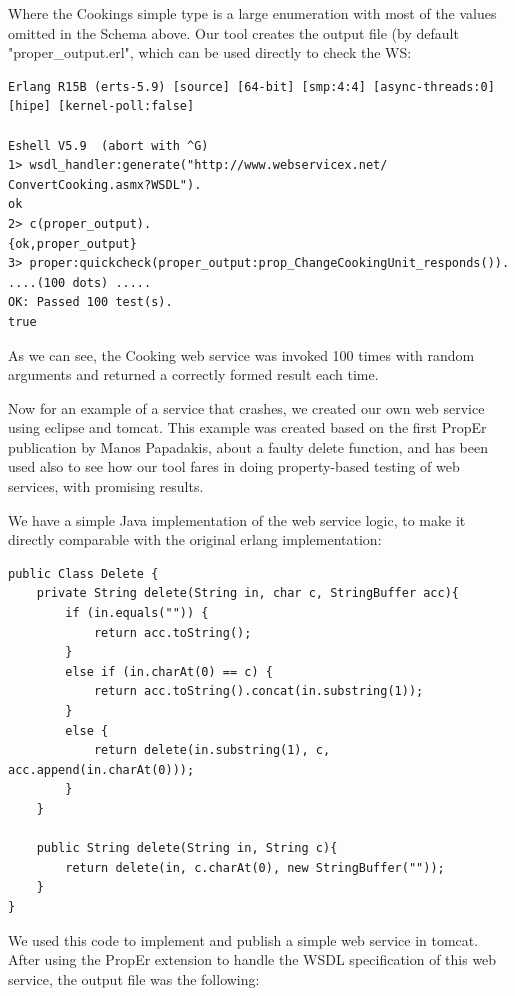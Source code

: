 \documentclass[submission,copyright,a4]{eptcs}
\begin{document}
Where the Cookings simple type is a large enumeration with most of the values 
omitted in the Schema above. Our tool creates the output file (by default 
"proper\_output.erl", which can be used directly to check the WS:

\begin{lstlisting}
Erlang R15B (erts-5.9) [source] [64-bit] [smp:4:4] [async-threads:0] [hipe] [kernel-poll:false]

Eshell V5.9  (abort with ^G)
1> wsdl_handler:generate("http://www.webservicex.net/
ConvertCooking.asmx?WSDL").
ok
2> c(proper_output).
{ok,proper_output}
3> proper:quickcheck(proper_output:prop_ChangeCookingUnit_responds()).
....(100 dots) .....
OK: Passed 100 test(s).
true
\end{lstlisting}

As we can see, the Cooking web service was invoked 100 times with random 
arguments and returned a correctly formed result each time.

Now for an example of a service that crashes, we created our own web service 
using eclipse and tomcat. This example was created based on the first PropEr 
publication by Manos Papadakis, about a faulty delete function, and has been
used also to see how our tool fares in doing property-based testing of web 
services, with promising results.

We have a simple Java implementation of the web service logic, to make it
directly comparable with the original erlang implementation:

\begin{lstlisting}
public Class Delete {
    private String delete(String in, char c, StringBuffer acc){
        if (in.equals("")) {
            return acc.toString();
        }
        else if (in.charAt(0) == c) {
            return acc.toString().concat(in.substring(1));
        }
        else {
            return delete(in.substring(1), c, acc.append(in.charAt(0)));
        }
    }
    
    public String delete(String in, String c){
        return delete(in, c.charAt(0), new StringBuffer(""));
    } 
}
\end{lstlisting}

We used this code to implement and publish a simple web service in tomcat. 
After using the PropEr extension to handle the WSDL specification of this 
web service, the output file was the following:
\end{document}
